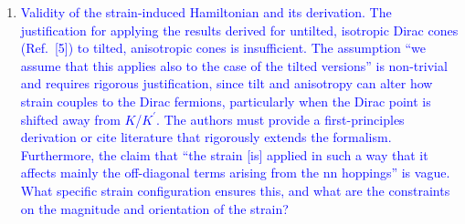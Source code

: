 \documentclass[aps,prb,onecolumn,nofootinbib,citeautoscript,10pt]{revtex4-2}
\begin{document}
\begin{enumerate}

\item \textcolor{blue}{Validity of the strain-induced Hamiltonian and its derivation. The justification for applying the results derived for untilted, isotropic Dirac cones (Ref.~[5]) to tilted, anisotropic cones is insufficient. The assumption ``we assume that this applies also to the case of the tilted versions'' is non-trivial and requires rigorous justification, since tilt and anisotropy can alter how strain couples to the Dirac fermions, particularly when the Dirac point is shifted away from $K$/$K^\prime$. The authors must provide a first-principles derivation or cite literature that rigorously extends the formalism. Furthermore, the claim that ``the strain [is] applied in such a way that it affects mainly the off-diagonal terms arising from the nn hoppings'' is vague. What specific strain configuration ensures this, and what are the constraints on the magnitude and orientation of the strain?}


\end{enumerate}
\end{document}
